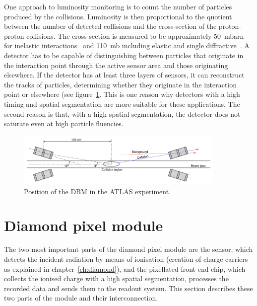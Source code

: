 One approach to luminosity monitoring is to count the number of particles produced by the collisions. Luminosity is then proportional to the quotient between the number of detected collisions and the cross-section of the proton-proton collisions. The cross-section is measured to be approximately 50~mbarn for inelastic interactions~\cite{Tompkins:1388995,0954-3899-38-12-124131} and 110~mb including elastic and single diffractive~\cite{ppcol:00000}. A detector has to be capable of distinguishing between particles that originate in the interaction point through the active sensor area and those originating elsewhere. If the detector has at least three layers of sensors, it can reconstruct the tracks of particles, determining whether they originate in the interaction point or elsewhere (see figure~\ref{fig:dbminatlas2}. This is one reason why detectors with a high timing and spatial segmentation are more suitable for these applications. The second reason is that, with a high spatial segmentation, the detector does not saturate even at high particle fluencies.


\begin{figure}[!t]
\centering
\includegraphics[width=0.9\textwidth]{04_charge_monitoring/pics/positioning}
\caption{Position of the DBM in the ATLAS experiment.}
\label{fig:dbminatlas2}
\end{figure}



\section{Diamond pixel module}
\label{sec:atlasdbm}
The two most important parts of the diamond pixel module are the sensor, which detects the incident radiation by means of ionisation (creation of charge carriers as explained in chapter~\ref{ch:diamond}), and the pixellated front-end chip, which collects the ionised charge with a high spatial segmentation, processes the recorded data and sends them to the readout system. This section describes these two parts of the module and their interconnection.

